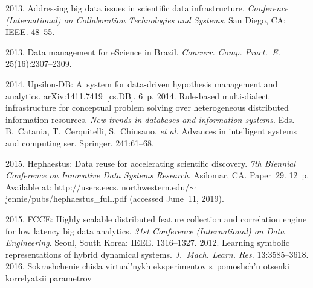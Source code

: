\begin{multicols}{2}
{{\begin{thebibliography}{99}
 2013. Addressing big data issues in 
scientific data infrastructure. \textit{Conference (International) on Collaboration Technologies 
and Systems}. San Diego, CA: IEEE. 48--55.

   2013. Data management for eScience in Brazil. 
\textit{Concurr. Comp. Pract.~E.} 25(16):2307--2309.



   2014. Upsilon-DB: A~system for data-driven 
hypothesis management and analytics. arXiv:1411.7419~[cs.DB]. 6~p.
   2014. Rule-based 
multi-dialect infrastructure for conceptual problem solving over heterogeneous distributed 
information resources. \textit{New trends in 
databases and information systems}.
Eds. B.~Catania, T.~Cerquitelli, S.~Chiusano, \textit{et al.}
 Advances in intelligent systems and computing ser.  Springer. 241:61--68.

 2015. Hephaestus: Data reuse for accelerating scientific 
discovery. \textit{7th Biennial Conference on Innovative Data Systems Research}. 
Asilomar, CA.  Paper~29. 12~p.
Available at: {\sf
http://users.eecs. northwestern.edu/$\sim$jennie/pubs/hephaestus\_full.pdf}
(accessed June~11, 2019).

 2015. FCCE: Highly 
scalable distributed feature collection and correlation engine for low latency big data analytics. 
\textit{31st  Conference (International) on Data Engineering}. 
Seoul, South Korea: IEEE. 
1316--1327.
 2012. Learning symbolic representations of hybrid dynamical 
systems. \textit{J.~Mach. Learn. Res.} 13:3585--3618.
 2016. Sokrashchenie chisla virtual'nykh eks\-pe\-ri\-men\-tov s~pomoshch'u otsenki 
korrelyatsii pa\-ra\-met\-rov\linebreak\vspace*{-12pt}

\pagebreak


\end{thebibliography}}}
\end{multicols}
